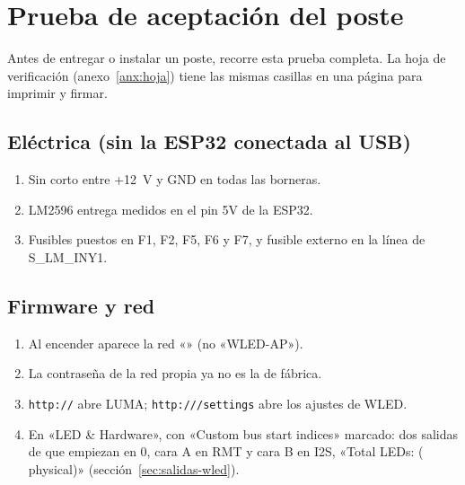\chapter{Prueba de aceptación del poste}\label{cap:aceptacion}

Antes de entregar o instalar un poste, recorre esta prueba completa. La hoja de verificación (anexo~\ref{anx:hoja}) tiene las mismas casillas en una página para imprimir y firmar.

\section{Eléctrica (sin la ESP32 conectada al USB)}
\begin{enumerate}
\item Sin corto entre +12~V y GND en todas las borneras.
\item LM2596 entrega  medidos en el pin 5V de la ESP32.
\item Fusibles puestos en F1, F2, F5, F6 y F7, y fusible externo en la línea de S\_LM\_INY1.
\end{enumerate}

\section{Firmware y red}
\begin{enumerate}[resume]
\item Al encender aparece la red «» (no «WLED-AP»).
\item La contraseña de la red propia ya no es la de fábrica.
\item \texttt{http://} abre LUMA; \texttt{http:///settings} abre los ajustes de WLED.
\item En «LED \& Hardware», con «Custom bus start indices» marcado: dos salidas de  que empiezan en 0, cara A en RMT y cara B en I2S, «Total LEDs:  ( physical)» (sección~\ref{sec:salidas-wled}).
\end{enumerate}

